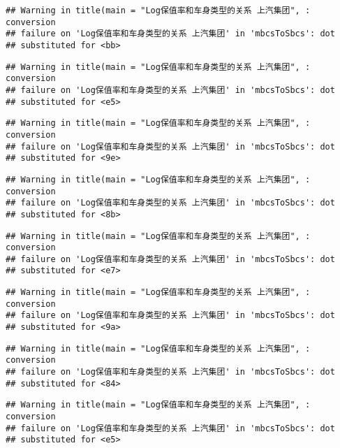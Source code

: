 \documentclass[]{article}
\begin{document}
\begin{verbatim}
## Warning in title(main = "Log保值率和车身类型的关系 上汽集团", : conversion
## failure on 'Log保值率和车身类型的关系 上汽集团' in 'mbcsToSbcs': dot
## substituted for <bb>
\end{verbatim}

\begin{verbatim}
## Warning in title(main = "Log保值率和车身类型的关系 上汽集团", : conversion
## failure on 'Log保值率和车身类型的关系 上汽集团' in 'mbcsToSbcs': dot
## substituted for <e5>
\end{verbatim}

\begin{verbatim}
## Warning in title(main = "Log保值率和车身类型的关系 上汽集团", : conversion
## failure on 'Log保值率和车身类型的关系 上汽集团' in 'mbcsToSbcs': dot
## substituted for <9e>
\end{verbatim}

\begin{verbatim}
## Warning in title(main = "Log保值率和车身类型的关系 上汽集团", : conversion
## failure on 'Log保值率和车身类型的关系 上汽集团' in 'mbcsToSbcs': dot
## substituted for <8b>
\end{verbatim}

\begin{verbatim}
## Warning in title(main = "Log保值率和车身类型的关系 上汽集团", : conversion
## failure on 'Log保值率和车身类型的关系 上汽集团' in 'mbcsToSbcs': dot
## substituted for <e7>
\end{verbatim}

\begin{verbatim}
## Warning in title(main = "Log保值率和车身类型的关系 上汽集团", : conversion
## failure on 'Log保值率和车身类型的关系 上汽集团' in 'mbcsToSbcs': dot
## substituted for <9a>
\end{verbatim}

\begin{verbatim}
## Warning in title(main = "Log保值率和车身类型的关系 上汽集团", : conversion
## failure on 'Log保值率和车身类型的关系 上汽集团' in 'mbcsToSbcs': dot
## substituted for <84>
\end{verbatim}

\begin{verbatim}
## Warning in title(main = "Log保值率和车身类型的关系 上汽集团", : conversion
## failure on 'Log保值率和车身类型的关系 上汽集团' in 'mbcsToSbcs': dot
## substituted for <e5>
\end{verbatim}
\end{document}
